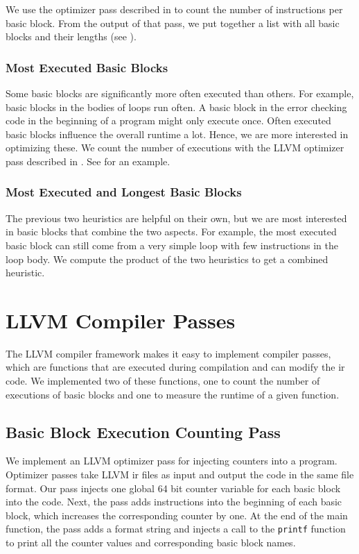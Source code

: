 We use the optimizer pass described in  to count the number of instructions per basic block.
From the output of that pass, we put together a list with all basic blocks and their lengths (see ).

\subsubsection{Most Executed Basic Blocks}
Some basic blocks are significantly more often executed than others.
For example, basic blocks in the bodies of loops run often.
A basic block in the error checking code in the beginning of a program might only execute once.
Often executed basic blocks influence the overall runtime a lot.
Hence, we are more interested in optimizing these.
We count the number of executions with the LLVM optimizer pass described in .
See  for an example.


\subsubsection{Most Executed and Longest Basic Blocks}
The previous two heuristics are helpful on their own, but we are most interested in basic blocks that combine the two aspects.
For example, the most executed basic block can still come from a very simple loop with few instructions in the loop body.
We compute the product of the two heuristics to get a combined heuristic.

\section{LLVM Compiler Passes}
The LLVM compiler framework makes it easy to implement compiler passes, which are functions that are executed during compilation and can modify the \ac{ir} code.
We implemented two of these functions, one to count the number of executions of basic blocks and one to measure the runtime of a given function.

\subsection{Basic Block Execution Counting Pass}
\label{sec:approach:pass-count}
We implement an LLVM optimizer pass for injecting counters into a program.
Optimizer passes take LLVM \ac{ir} files as input and output the code in the same file format.
Our pass injects one global 64 bit counter variable for each basic block into the code.
Next, the pass adds instructions into the beginning of each basic block, which increases the corresponding counter by one.
At the end of the main function, the pass adds a format string and injects a call to the \lstinline{printf} function to print all the counter values and corresponding basic block names.

